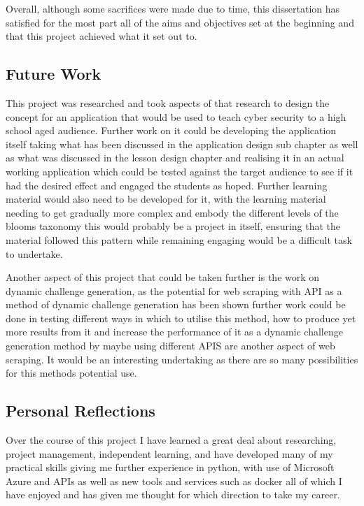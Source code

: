 \documentclass[12pt,a4paper]{article}
\begin{document}
Overall, although some sacrifices were made due to time, this dissertation has satisfied for the most part all of the aims and objectives set at the beginning and that this project achieved what it set out to.

\subsection{Future Work} 
This project was researched and took aspects of that research to design the concept for an application that would be used to teach cyber security to a high school aged audience. Further work on it could be developing the application itself taking what has been discussed in the application design sub chapter as well as what was discussed in the lesson design chapter and realising it in an actual working application which could be tested against the target audience to see if it had the desired effect and engaged the students as hoped. Further learning material would also need to be developed for it, with the learning material needing to get gradually more complex and embody the different levels of the blooms taxonomy this would probably be a project in itself, ensuring that the material followed this pattern while remaining engaging would be a difficult task to undertake.  

Another aspect of this project that could be taken further is the work on dynamic challenge generation, as the potential for web scraping with API as a method of dynamic challenge generation has been shown further work could be done in testing different ways in which to utilise this method, how to produce yet more results from it and increase the performance of it as a dynamic challenge generation method by maybe using different APIS are another aspect of web scraping. It would be an interesting undertaking as there are so many possibilities for this methods potential use. 

\subsection{Personal Reflections}  

Over the course of this project I have learned a great deal about researching, project management, independent learning, and have developed many of my practical skills giving me further experience in python, with use of Microsoft Azure and APIs as well as new tools and services such as docker all of which I have enjoyed and has given me thought for which direction to take my career. 
\end{document}
